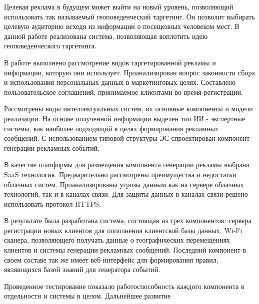 \conclusion

Целевая реклама в будущем может выйти на новый уровень, позволяющий использовать так называемый геоповеденческий таргетинг. Он позволит выбирать целевую аудиторию исходя из информации о посещенных человеком мест. В данной работе реализована система, позволяющая воплотить идею геоповеденческого таргетинга.

В работе выполнено рассмотрение видов таргетированной рекламы и информации, которую они использует. Проанализирован вопрос законности сбора и использования персональных данных в маркетинговых целях. Составлено пользовательское соглашений, принимаемое клиентами во время регистрации.

Рассмотрены виды интеллектуальных систем, их основные компоненты и модели реализации. На основе полученной информации выделен тип ИИ - экспертные системы, как наиболее подходящий в целях формирования рекламных сообщений. С использованием типовой структуры ЭС спроектирован компонент генерации рекламных событий.

В качестве платформы для размещения компонента генерации рекламы выбрана SaaS технология. Предварительно рассмотрены преимущества и недостатки облачных систем. Проанализированы угрозы данным как на сервере облачных технологий, так и в каналах связи. Для защиты данных в каналах связи решено использовать протокол HTTPS.

В результате была разработана система, состоящая из трех компонентов: сервера регистрации новых клиентов для пополнения клиентской базы данных, Wi-Fi сканера, позволяющего получать данные о географических перемещениях клиентов и системы генерации рекламных сообщений. Последний компонент в своем составе так же имеет веб-интерфейс для формирования правил, являющихся базой знаний для генератора событий.

Проведенное тестирование показало работоспособность каждого компонента в отдельности и системы в целом. Дальнейшее развитие

\blindtext
